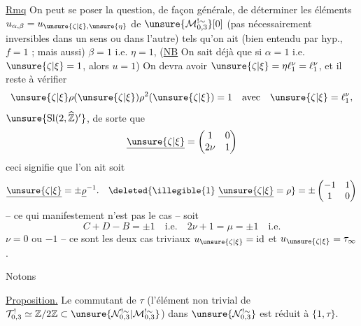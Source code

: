 \uline{Rmq} On peut se poser la question, de façon générale,
de déterminer les éléments
$u_{\alpha,\beta}=u_{\unsure{\zeta|\xi},\unsure{\eta}}$
de $\unsure{\mathcal M_{0,3}^{!\sim}}[0]$
(pas nécessairement inversibles dans un sens ou dans l'autre)
tels qu'on ait (bien entendu par hyp., $f=1$ ; mais aussi)
 $\beta=1$ i.e. $\eta=1$,
 
(\uline{NB} On sait déjà que si $\alpha=1$ i.e.
$\unsure{\zeta|\xi}=1$, alors $u=1$)
On devra avoir
$\unsure{\zeta|\xi}=\eta\ell_1^\nu=\ell_1^\nu$,
et il reste à vérifier
\[
\unsure{\zeta|\xi}\rho(\unsure{\zeta|\xi})
\rho^2(\unsure{\zeta|\xi})=1\quad\text{avec}\quad
\unsure{\zeta|\xi}=\ell_1^\nu,
\]
$\unsure{\mathrm{Sl}(2,\widehat{\mathbb Z})'}$,
 de sorte que
\[
\underline{\unsure{\zeta|\xi}}=
\begin{pmatrix}1&0\\2\nu&1\end{pmatrix}
\]
ceci signifie  que l'on ait soit
\[
\underline{\unsure{\zeta|\xi}}=\pm\underline\rho^{-1}.
\quad\deleted{\illegible{1}\ \underline{\unsure{\zeta|\xi}}=\rho}
=\pm\begin{pmatrix}-1&1\\1&0\end{pmatrix}
\]
-- ce qui manifestement n'est pas le cas -- soit
\[
C+D-B=\pm1\quad\text{i.e.}\quad2\nu+1=\mu=\pm1\quad\text{i.e.}
\]
$\nu=0$ ou $-1$ -- ce sont les deux cas triviaux
$u_{\unsure{\zeta|\xi}}=\mathrm{id}$ et
$u_{\unsure{\zeta|\xi}}=\tau_\infty$.



Notons 

\uline{Proposition.} Le commutant de $\tau$ (l'élément
non trivial de $\mathcal T_{0,3}^{!}\simeq\mathbb Z/2\mathbb Z
\subset\unsure{\mathcal N_{0,3}^{!\sim}|\mathcal M_{0,3}^{!\sim}}$)
dans $\unsure{\mathcal N_{0,3}^{!\sim}}$ est réduit à $\{1,\tau\}$.


